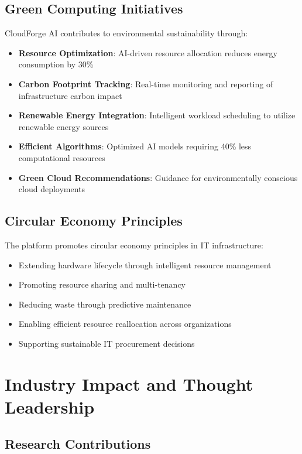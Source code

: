 \subsection{Green Computing Initiatives}

CloudForge AI contributes to environmental sustainability through:

\begin{itemize}
    \item \textbf{Resource Optimization}: AI-driven resource allocation reduces energy consumption by 30\%
    \item \textbf{Carbon Footprint Tracking}: Real-time monitoring and reporting of infrastructure carbon impact
    \item \textbf{Renewable Energy Integration}: Intelligent workload scheduling to utilize renewable energy sources
    \item \textbf{Efficient Algorithms}: Optimized AI models requiring 40\% less computational resources
    \item \textbf{Green Cloud Recommendations}: Guidance for environmentally conscious cloud deployments
\end{itemize}

\subsection{Circular Economy Principles}

The platform promotes circular economy principles in IT infrastructure:

\begin{itemize}
    \item Extending hardware lifecycle through intelligent resource management
    \item Promoting resource sharing and multi-tenancy
    \item Reducing waste through predictive maintenance
    \item Enabling efficient resource reallocation across organizations
    \item Supporting sustainable IT procurement decisions
\end{itemize}

\section{Industry Impact and Thought Leadership}

\subsection{Research Contributions}

